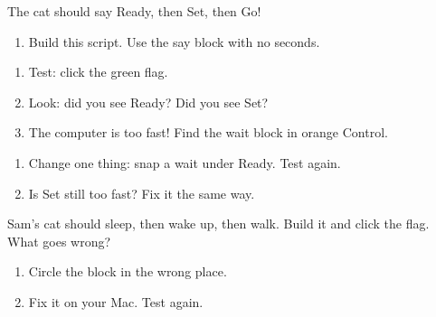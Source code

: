 \begin{exercise}
The cat should say Ready, then Set, then Go!
\begin{enumerate}[leftmargin=1.4em,itemsep=2pt]
  \item Build this script. Use the say block with no seconds.
\end{enumerate}
\begin{center}
\begin{scratch}[scale=0.9]
\end{scratch}
\end{center}
\begin{enumerate}[leftmargin=1.4em,itemsep=2pt,start=2]
  \item Test: click the green flag.
  \item Look: did you see Ready? Did you see Set?
  \item The computer is too fast! Find the wait block in orange Control.
\end{enumerate}
\begin{center}
\begin{scratch}[scale=0.9]
\end{scratch}
\end{center}
\begin{enumerate}[leftmargin=1.4em,itemsep=2pt,start=5]
  \item Change one thing: snap a wait under Ready. Test again.
  \item Is Set still too fast? Fix it the same way.
\end{enumerate}
\end{exercise}

\begin{exercise}
Sam's cat should sleep, then wake up, then walk. Build it and click the flag. What goes wrong?
\begin{center}
\begin{scratch}[scale=0.9]
\end{scratch}
\end{center}
\begin{enumerate}[leftmargin=1.4em,itemsep=2pt]
  \item Circle the block in the wrong place.
  \item Fix it on your Mac. Test again.
\end{enumerate}
\end{exercise}

